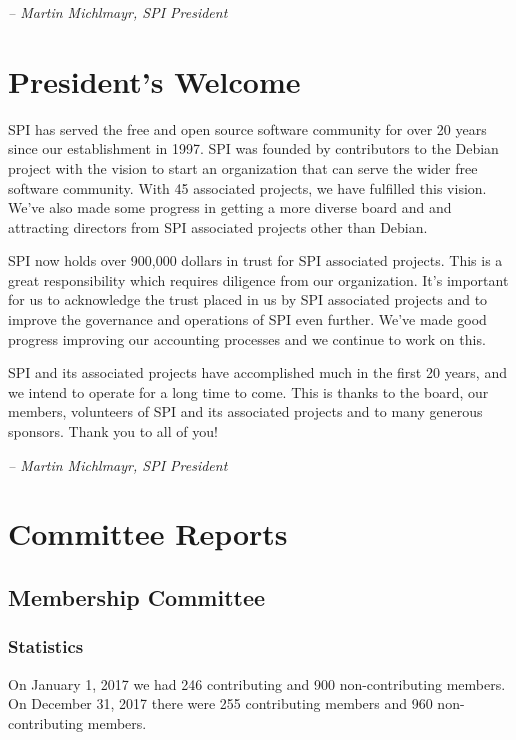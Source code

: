 \documentclass[a4paper]{report}
\begin{document}
  \emph{-- Martin Michlmayr, SPI President}

\newpage

\tableofcontents

\newpage

\chapter{President's Welcome}
\label{sec:president}

SPI has served the free and open source software community for over 20
years since our establishment in 1997.  SPI was founded by contributors
to the Debian project with the vision to start an organization that can
serve the wider free software community.  With 45 associated projects,
we have fulfilled this vision.  We've also made some progress in getting
a more diverse board and and attracting directors from SPI associated
projects other than Debian.

SPI now holds over 900,000 dollars in trust for SPI associated projects.
This is a great responsibility which requires diligence from our
organization.  It's important for us to acknowledge the trust placed in
us by SPI associated projects and to improve the governance and
operations of SPI even further.  We've made good progress improving our
accounting processes and we continue to work on this.

SPI and its associated projects have accomplished much in the first 20
years, and we intend to operate for a long time to come.  This is thanks
to the board, our members, volunteers of SPI and its associated projects
and to many generous sponsors.  Thank you to all of you!

  \emph{-- Martin Michlmayr, SPI President}

\chapter{Committee Reports}
\section{Membership Committee}

\subsection{Statistics}

On January 1, 2017 we had 246 contributing and 900 non-contributing
members.  On December 31, 2017 there were 255 contributing members and
960 non-contributing members.
\end{document}
